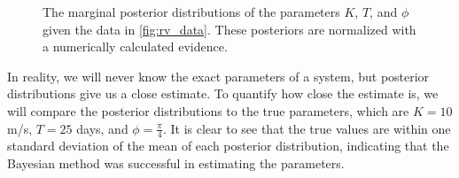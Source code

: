 \documentclass[preprint,longauthor]{aastex631}
\numberwithin{equation}{section}
\begin{document}
\begin{figure}[ht!]
\centering

\hfill
{}
\hfill
{}
\caption{The marginal posterior distributions of the parameters $K$, $T$, and $\phi$ given the data in \autoref{fig:rv_data}. These posteriors are normalized with a numerically calculated evidence.}
\label{fig:ex_posteriors}
\end{figure}

In reality, we will never know the exact parameters of a system, but posterior distributions give us a close estimate. To quantify how close the estimate is, we will compare the posterior distributions to the true parameters, which are $K=10$ m/s, $T=25$ days, and $\phi=\frac{\pi}{4}$. It is clear to see that the true values are within one standard deviation of the mean of each posterior distribution, indicating that the Bayesian method was successful in estimating the parameters.
\end{document}
